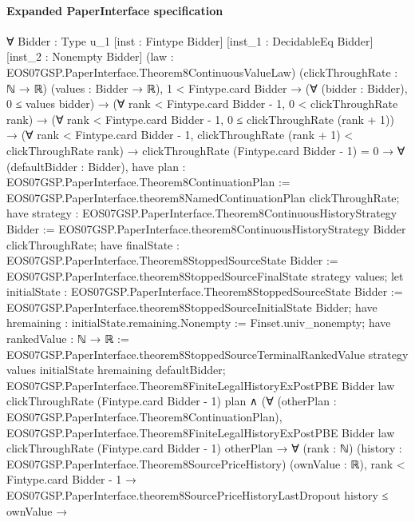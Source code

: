 \documentclass[10pt]{article}
\begin{document}
\paragraph{Expanded PaperInterface specification}
\begin{ReviewVerbatim}
∀ {Bidder : Type u_1} [inst : Fintype Bidder] [inst_1 : DecidableEq Bidder] [inst_2 : Nonempty Bidder]
  (law : EOS07GSP.PaperInterface.Theorem8ContinuousValueLaw) (clickThroughRate : ℕ → ℝ) (values : Bidder → ℝ),
  1 < Fintype.card Bidder →
    (∀ (bidder : Bidder), 0 ≤ values bidder) →
      (∀ rank < Fintype.card Bidder - 1, 0 < clickThroughRate rank) →
        (∀ rank < Fintype.card Bidder - 1, 0 ≤ clickThroughRate (rank + 1)) →
          (∀ rank < Fintype.card Bidder - 1, clickThroughRate (rank + 1) < clickThroughRate rank) →
            clickThroughRate (Fintype.card Bidder - 1) = 0 →
              ∀ (defaultBidder : Bidder),
                have plan : EOS07GSP.PaperInterface.Theorem8ContinuationPlan :=
                  EOS07GSP.PaperInterface.theorem8NamedContinuationPlan clickThroughRate;
                have strategy : EOS07GSP.PaperInterface.Theorem8ContinuousHistoryStrategy Bidder :=
                  EOS07GSP.PaperInterface.theorem8ContinuousHistoryStrategy Bidder clickThroughRate;
                have finalState : EOS07GSP.PaperInterface.Theorem8StoppedSourceState Bidder :=
                  EOS07GSP.PaperInterface.theorem8StoppedSourceFinalState strategy values;
                let initialState : EOS07GSP.PaperInterface.Theorem8StoppedSourceState Bidder :=
                  EOS07GSP.PaperInterface.theorem8StoppedSourceInitialState Bidder;
                have hremaining : initialState.remaining.Nonempty := Finset.univ_nonempty;
                have rankedValue : ℕ → ℝ :=
                  EOS07GSP.PaperInterface.theorem8StoppedSourceTerminalRankedValue strategy values initialState
                    hremaining defaultBidder;
                EOS07GSP.PaperInterface.Theorem8FiniteLegalHistoryExPostPBE Bidder law clickThroughRate
                    (Fintype.card Bidder - 1) plan ∧
                  (∀ (otherPlan : EOS07GSP.PaperInterface.Theorem8ContinuationPlan),
                      EOS07GSP.PaperInterface.Theorem8FiniteLegalHistoryExPostPBE Bidder law clickThroughRate
                          (Fintype.card Bidder - 1) otherPlan →
                        ∀ (rank : ℕ) (history : EOS07GSP.PaperInterface.Theorem8SourcePriceHistory) (ownValue : ℝ),
                          rank < Fintype.card Bidder - 1 →
                            EOS07GSP.PaperInterface.theorem8SourcePriceHistoryLastDropout history ≤ ownValue →

\end{ReviewVerbatim}
\end{document}
